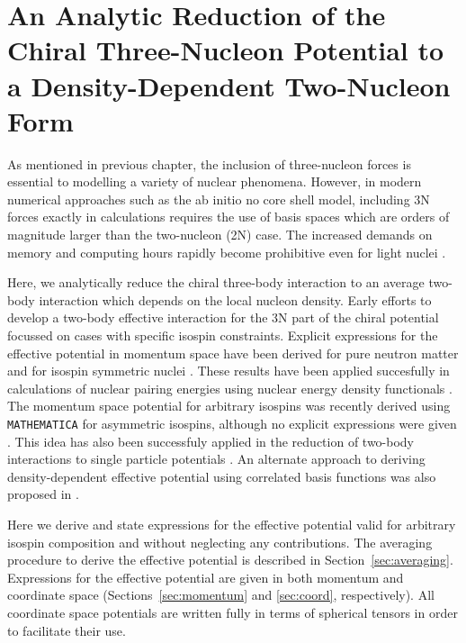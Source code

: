 
\chapter{\label{chap:3to2}An Analytic Reduction of the Chiral Three-Nucleon Potential to a Density-Dependent Two-Nucleon Form}


As mentioned in previous chapter, the inclusion of three-nucleon forces is essential to modelling a variety of nuclear phenomena. However, in modern numerical approaches such as the ab initio no core shell model, including 3N forces exactly in calculations requires the use of basis spaces which are orders of magnitude larger than the two-nucleon (2N) case. The increased demands on memory and computing hours rapidly become prohibitive even for light nuclei \cite{ABNCSM}. 

Here, we analytically reduce the chiral three-body interaction to an average two-body interaction which depends on the local nucleon density. Early efforts to develop a two-body effective interaction for the 3N part of the chiral potential focussed  on cases with specific isospin constraints. Explicit expressions for  the effective potential in momentum space have been derived for pure neutron matter \cite{PhysRevC.82.014314} and for isospin symmetric nuclei \cite{PhysRevC.81.024002}. These results have been applied succesfully in calculations of nuclear pairing energies using nuclear energy density functionals \cite{0954-3899-39-1-015108}. The momentum space potential for arbitrary isospins was recently derived using \texttt{MATHEMATICA} for asymmetric isospins, although no explicit expressions were given \cite{Drischler:2015eba}. This idea has also been successfuly applied in the reduction of two-body interactions to single particle potentials \cite{PhysRev.133.B329,AdelbergerHaxton}.  An alternate approach to deriving density-dependent effective potential using correlated basis functions was also proposed in \cite{PhysRevC.83.054003}. 

Here we derive and state expressions for the effective potential valid for arbitrary isospin composition and without neglecting any contributions. The averaging procedure to derive the effective potential is described in Section~\ref{sec:averaging}. Expressions for the effective potential are given in both momentum and coordinate space (Sections~\ref{sec:momentum} and \ref{sec:coord}, respectively). All coordinate space potentials are written fully in terms of spherical tensors in order to facilitate their use. 

